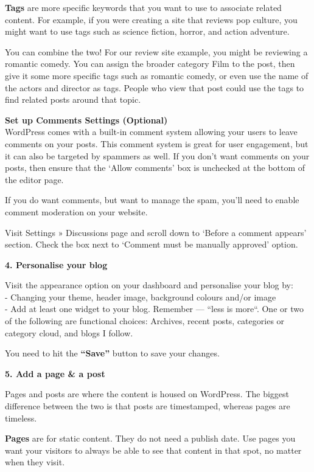 \documentclass[
]{book}
\theoremstyle{definition}
\theoremstyle{definition}
\theoremstyle{definition}
\theoremstyle{definition}
\theoremstyle{remark}
\begin{document}
\begin{reflect}
\textbf{Tags} are more specific keywords that you want to use to associate related content. For example, if you were creating a site that reviews pop culture, you might want to use tags such as science fiction, horror, and action adventure.

You can combine the two! For our review site example, you might be reviewing a romantic comedy. You can assign the broader category Film to the post, then give it some more specific tags such as romantic comedy, or even use the name of the actors and director as tags. People who view that post could use the tags to find related posts around that topic.

\textbf{Set up Comments Settings (Optional)}\\
WordPress comes with a built-in comment system allowing your users to leave comments on your posts. This comment system is great for user engagement, but it can also be targeted by spammers as well. If you don't want comments on your posts, then ensure that the `Allow comments' box is unchecked at the bottom of the editor page.

If you do want comments, but want to manage the spam, you'll need to enable comment moderation on your website.

Visit Settings » Discussions page and scroll down to `Before a comment appears' section. Check the box next to `Comment must be manually approved' option.

\textbf{4. Personalise your blog}

Visit the appearance option on your dashboard and personalise your blog by:\\
- Changing your theme, header image, background colours and/or image\\
- Add at least one widget to your blog. Remember --- ``less is more``. One or two of the following are functional choices: Archives, recent posts, categories or category cloud, and blogs I follow.

You need to hit the \textbf{``Save''} button to save your changes.

\textbf{5. Add a page \& a post}

Pages and posts are where the content is housed on WordPress. The biggest difference between the two is that posts are timestamped, whereas pages are timeless.

\textbf{Pages} are for static content. They do not need a publish date. Use pages you want your visitors to always be able to see that content in that spot, no matter when they visit.


\end{reflect}
\end{document}
